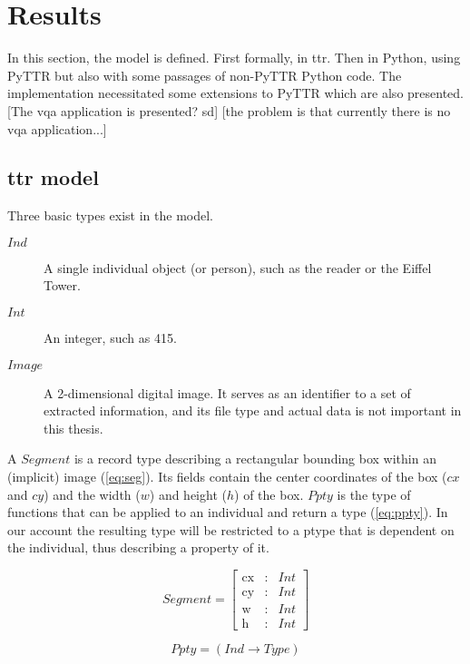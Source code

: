 \section{Results}
\label{sec:results}

In this section, the model is defined.
First formally, in \gls{ttr}.
Then in Python, using PyTTR but also with some passages of non-PyTTR Python code.
The implementation necessitated some extensions to PyTTR which are also presented.
[The vqa application is presented? sd] [the problem is that currently there is no vqa application...]



\subsection{\Gls{ttr} model}

Three basic types exist in the model.

\begin{description}
\item [$Ind$] A single individual object (or person), such as the reader or the Eiffel Tower.
\item [$Int$] An integer, such as 415.
\item [$Image$] A 2-dimensional digital image. It serves as an identifier to a set of extracted information, and its file type and actual data is not important in this thesis.
\end{description}

A $Segment$ is a record type describing a rectangular bounding box within an (implicit) image (\autoref{eq:seg}).
Its fields contain the center coordinates of the box ($cx$ and $cy$) and the width ($w$) and height ($h$) of the box.
$Ppty$ is the type of functions that can be applied to an individual and return a type (\autoref{eq:ppty}).
In our account the resulting type will be restricted to a ptype that is dependent on the individual, thus describing a property of it.

\begin{equation}\label{eq:seg}
Segment = \left[\begin{array}{rcl}
\text{cx} &:& Int\\
\text{cy} &:& Int\\
\text{w} &:& Int\\
\text{h} &:& Int
\end{array}\right]\end{equation}

\begin{equation}\label{eq:ppty}
Ppty = (Ind \rightarrow Type)\end{equation}

